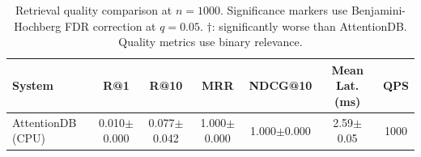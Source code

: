 \begin{table}[htbp]
\centering
\caption{Retrieval quality comparison at $n=1000$. Significance markers use Benjamini-Hochberg FDR correction at $q=0.05$. $\dagger$: significantly worse than AttentionDB. Quality metrics use binary relevance.}
\label{tab:main}
\begin{tabular}{lcccccc}
\toprule
System & R@1 & R@10 & MRR & NDCG@10 & Mean Lat. (ms) & QPS \\
\midrule
AttentionDB (CPU) & 0.010$\pm$0.000 & 0.077$\pm$0.042 & 1.000$\pm$0.000 & 1.000$\pm$0.000 & 2.59$\pm$0.05 & 1000 \\
\bottomrule
\end{tabular}
\end{table}
